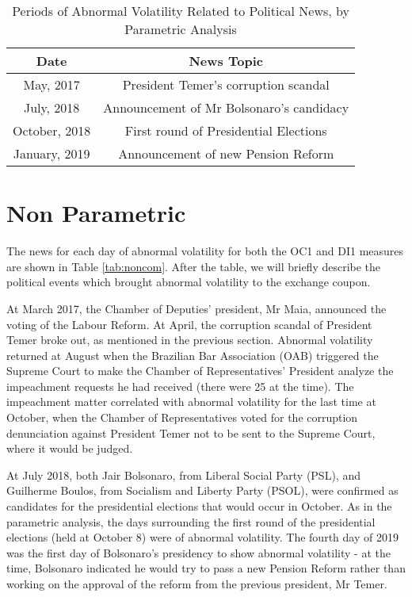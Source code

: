 \documentclass[cic,tc, english]{iiufrgs}
\begin{document}
    \begin{table}[H]
        \caption{Periods of Abnormal Volatility Related to Political News, by Parametric Analysis}
        \label{tab:respar}
        \centering
        \begin{tabular}{ | c | c | }
            \hline
            Date & News Topic \\
            \hline \hline
            May, 2017 & President Temer's corruption scandal \\
            \hline
            July, 2018 & Announcement of Mr Bolsonaro's candidacy \\
            \hline
            October, 2018 & First round of Presidential Elections \\
            \hline
            January, 2019 & Announcement of new Pension Reform \\
            \hline
        \end{tabular}
    \end{table}

\section{Non Parametric}

    The news for each day of abnormal volatility for both the OC1 and DI1 measures are shown in Table \ref{tab:noncom}. After the table, we will briefly describe the political events which brought abnormal volatility to the exchange coupon.
   
   
   
   At March 2017, the Chamber of Deputies' president, Mr Maia, announced the voting of the Labour Reform. At April, the corruption scandal of President Temer broke out, as mentioned in the previous section. Abnormal volatility returned at August when the Brazilian Bar Association (OAB) triggered the Supreme Court to make the Chamber of Representatives' President analyze the impeachment requests he had received (there were 25 at the time). The impeachment matter correlated with abnormal volatility for the last time at October, when the Chamber of Representatives voted for the corruption denunciation against President Temer not to be sent to the Supreme Court, where it would be judged.
    
    At July 2018, both Jair Bolsonaro, from Liberal Social Party (PSL), and Guilherme Boulos, from Socialism and Liberty Party (PSOL), were confirmed as candidates for the presidential elections that would occur in October. As in the parametric analysis, the days surrounding the first round of the presidential elections (held at October 8) were of abnormal volatility. The fourth day of 2019 was the first day of Bolsonaro's presidency to show abnormal volatility - at the time, Bolsonaro indicated he would try to pass a new Pension Reform rather than working on the approval of the reform from the previous president, Mr Temer. 
\end{document}
